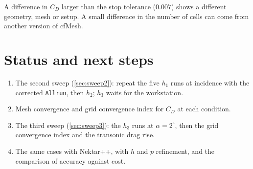 \documentclass[11pt,a4paper]{article}
\begin{document}
A difference in $C_D$ larger than the stop tolerance (0.007) shows a different geometry,
mesh or setup. A small difference in the number of cells can come from another
version of cfMesh.

\section{Status and next steps}

\begin{enumerate}
\item The second sweep (\cref{sec:sweep2}): repeat the five $h_1$ runs at incidence
  with the corrected \texttt{Allrun}, then $h_2$; $h_3$ waits for the workstation.
\item Mesh convergence and grid convergence index for $C_D$ at each condition.
\item The third sweep (\cref{sec:sweep3}): the $h_3$ runs at $\alpha = 2^\circ$, then the
  grid convergence index and the transonic drag rise.
\item The same cases with Nektar++, with $h$ and $p$ refinement, and the comparison of
  accuracy against cost.
\end{enumerate}


\nocite{toolchain2026,celik2008}

\end{document}
